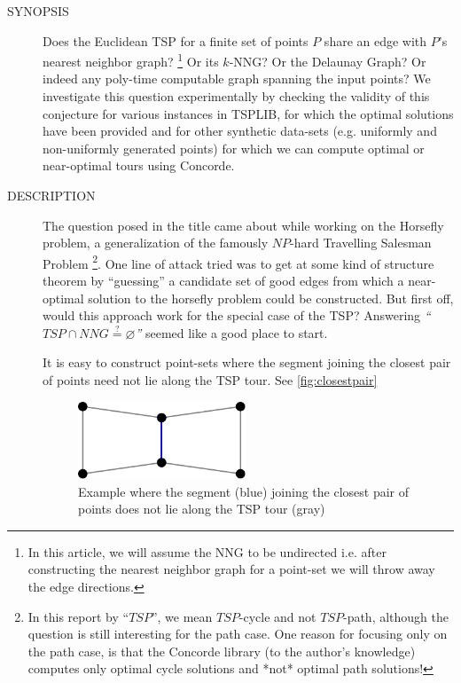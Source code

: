 \vspace{5mm}
\begin{description}
  \item[SYNOPSIS] Does the Euclidean TSP for a finite set of points $P$ share an edge with $P$'s nearest neighbor graph? \footnote{In this article, we will assume the NNG to be undirected i.e. after constructing the nearest neighbor graph for a point-set we will throw away the edge directions.}
     Or its $k$-NNG? Or the Delaunay Graph? 
     Or indeed any poly-time computable graph spanning the input points? We investigate
     this question experimentally by checking the validity of this conjecture for  
     various instances  in TSPLIB, for which the optimal solutions
     have been provided and for other synthetic data-sets (e.g. uniformly and non-uniformly generated points)
     for which we can compute optimal or near-optimal tours using Concorde. 
                   
  \item[DESCRIPTION] The question posed in the title came about while working on the Horsefly problem, 
     a generalization of the famously $NP$-hard Travelling Salesman Problem \footnote{In this report by ``$TSP$'', we mean $TSP$-cycle and not $TSP$-path, although the question is still interesting for the path case. One reason for focusing only on the path case, is that the Concorde library (to the author's knowledge) computes only optimal cycle solutions and *not* optimal path solutions!}. 
     One line of attack tried was to get at some kind of structure theorem by ``guessing''  a candidate set of good edges from which a near-optimal solution to the 
     horsefly problem could be constructed. But first off, would this approach work for the special case of the  TSP?  Answering
     \textit{``$TSP \cap NNG \stackrel{?}{=} \varnothing$''} seemed like a good place to start.  

     It is easy to construct point-sets where the segment joining the closest pair of points need not lie along the TSP tour. See \autoref{fig:closestpair}

     \begin{figure}[ht]
       \centering
       \includegraphics[width=5cm]{asytikz/closest-pair-example.pdf}
       \caption{\label{fig:closestpair} Example where the segment (blue) joining the closest pair of points does not lie along the TSP tour (gray)}
     \end{figure}


\end{description}
